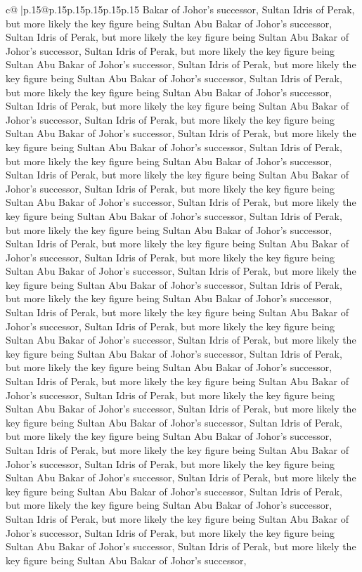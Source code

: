 \documentclass{article}
\begin{document}
{\begin{supertabular}{c@{$\;$}|p{.15\linewidth}@{}p{.15\linewidth}p{.15\linewidth}p{.15\linewidth}p{.15\linewidth}p{.15\linewidth}}
{{{Bakar of Johor's successor, Sultan Idris of Perak, but more likely the key figure being Sultan Abu Bakar of Johor's successor, Sultan Idris of Perak, but more likely the key figure being Sultan Abu Bakar of Johor's successor, Sultan Idris of Perak, but more likely the key figure being Sultan Abu Bakar of Johor's successor, Sultan Idris of Perak, but more likely the key figure being Sultan Abu Bakar of Johor's successor, Sultan Idris of Perak, but more likely the key figure being Sultan Abu Bakar of Johor's successor, Sultan Idris of Perak, but more likely the key figure being Sultan Abu Bakar of Johor's successor, Sultan Idris of Perak, but more likely the key figure being Sultan Abu Bakar of Johor's successor, Sultan Idris of Perak, but more likely the key figure being Sultan Abu Bakar of Johor's successor, Sultan Idris of Perak, but more likely the key figure being Sultan Abu Bakar of Johor's successor, Sultan Idris of Perak, but more likely the key figure being Sultan Abu Bakar of Johor's successor, Sultan Idris of Perak, but more likely the key figure being Sultan Abu Bakar of Johor's successor, Sultan Idris of Perak, but more likely the key figure being Sultan Abu Bakar of Johor's successor, Sultan Idris of Perak, but more likely the key figure being Sultan Abu Bakar of Johor's successor, Sultan Idris of Perak, but more likely the key figure being Sultan Abu Bakar of Johor's successor, Sultan Idris of Perak, but more likely the key figure being Sultan Abu Bakar of Johor's successor, Sultan Idris of Perak, but more likely the key figure being Sultan Abu Bakar of Johor's successor, Sultan Idris of Perak, but more likely the key figure being Sultan Abu Bakar of Johor's successor, Sultan Idris of Perak, but more likely the key figure being Sultan Abu Bakar of Johor's successor, Sultan Idris of Perak, but more likely the key figure being Sultan Abu Bakar of Johor's successor, Sultan Idris of Perak, but more likely the key figure being Sultan Abu Bakar of Johor's successor, Sultan Idris of Perak, but more likely the key figure being Sultan Abu Bakar of Johor's successor, Sultan Idris of Perak, but more likely the key figure being Sultan Abu Bakar of Johor's successor, Sultan Idris of Perak, but more likely the key figure being Sultan Abu Bakar of Johor's successor, Sultan Idris of Perak, but more likely the key figure being Sultan Abu Bakar of Johor's successor, Sultan Idris of Perak, but more likely the key figure being Sultan Abu Bakar of Johor's successor, Sultan Idris of Perak, but more likely the key figure being Sultan Abu Bakar of Johor's successor, Sultan Idris of Perak, but more likely the key figure being Sultan Abu Bakar of Johor's successor, Sultan Idris of Perak, but more likely the key figure being Sultan Abu Bakar of Johor's successor, Sultan Idris of Perak, but more likely the key figure being Sultan Abu Bakar of Johor's successor, Sultan Idris of Perak, but more likely the key figure being Sultan Abu Bakar of Johor's successor, Sultan Idris of Perak, but more likely the key figure being Sultan Abu Bakar of Johor's successor, Sultan Idris of Perak, but more likely the key figure being Sultan Abu Bakar of Johor's successor, }}}
\end{supertabular}}
\end{document}

